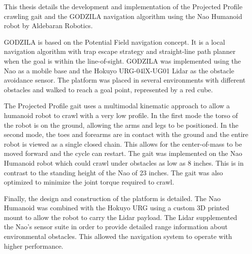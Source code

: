 {}
{
This thesis details the development and implementation of the Projected Profile
crawling gait and the GODZILA navigation algorithm using the Nao Humanoid
robot by Aldebaran Robotics.

GODZILA is based on the Potential Field navigation concept. It is a local
navigation algorithm with trap escape strategy and straight-line path planner 
when the goal is within the line-of-sight. GODZILA was implemented using the Nao
as a mobile base and the Hokuyo URG-04lX-UG01 Lidar as the obstacle avoidance
sensor. The platform was placed in several environments with different
obstacles and walked to reach a goal point, represented by a red cube. 

The Projected Profile gait uses a multimodal kinematic approach to
allow a humanoid robot to crawl with a very low profile.
In the first mode the torso of the robot is on the ground, allowing the
arms and legs to be positioned. In the second mode, the toes and forearms
are in contact with the ground and the entire robot is viewed as a single 
closed chain. This allows for the center-of-mass to be moved forward and the
cycle can restart.
The gait was implemented on the Nao Humanoid robot which could crawl under
obstacles as low as 8 inches. This is in contrast to the standing height of the
Nao of 23 inches. The gait was also optimized to minimize the joint torque 
required to crawl.

Finally, the design and construction of the platform is detailed.
The Nao Humanoid was combined with the Hokuyo URG using a custom 3D printed
mount to allow the robot to carry the Lidar payload.
The Lidar supplemented the Nao's sensor suite in order to provide detailed
range information about environmental obstacles. This allowed the navigation
system to operate with higher performance. 

\clearpage}
{\endmsabstract}
